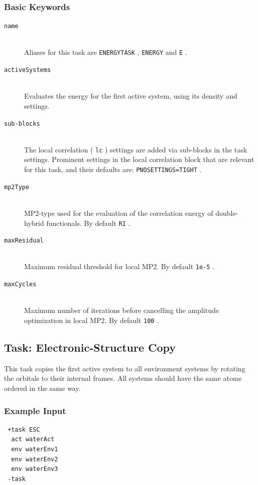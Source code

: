 \documentclass[bibliography=totocnumbered,a4paper,10pt,oneside]{scrbook}
\newcommand{\ttt}[1]{%
  \begingroup\setlength{\fboxsep}{1pt}%
  \colorbox{serenity-green!30}{\texttt{\hspace*{2pt}\vphantom{(g}#1\hspace*{2pt}}}%
  \endgroup
}
\begin{document}
\subsubsection{Basic Keywords}
\begin{description}
  \item [\texttt{name}]\hfill \\
  Aliases for this task are \ttt{ENERGYTASK}, \ttt{ENERGY} and \ttt{E}.
  \item [\texttt{activeSystems}]\hfill \\
   Evaluates the energy for the first active system, using its density and settings.
   \item [\texttt{sub-blocks}]\hfill \\
   The local correlation (\ttt{lc}) settings are added via sub-blocks in the task settings.
   Prominent settings in the local correlation block that are relevant for this task, and their defaults are:
    \ttt{PNOSETTINGS=TIGHT}.
    \item [\texttt{mp2Type}]\hfill \\
    MP2-type used for the evaluation of the correlation energy of double-hybrid functionals. By default \ttt{RI}.
    \item [\texttt{maxResidual}]\hfill \\
    Maximum residual threshold for local MP2. By default \ttt{1e-5}.
    \item [\texttt{maxCycles}]\hfill \\
    Maximum number of iterations before cancelling the amplitude optimization in local MP2. By default \ttt{100}.
\end{description}

\subsection{Task: Electronic-Structure Copy}
This task copies the first active system to all environment systems by rotating the
orbitals to their internal frames. All systems should have the same atoms ordered
in the same way.
\subsubsection{Example Input}
\begin{lstlisting}
 +task ESC
  act waterAct
  env waterEnv1
  env waterEnv2
  env waterEnv3
 -task
\end{lstlisting}
\end{document}
